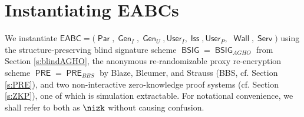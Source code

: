 \documentclass[runningheads]{llncs}
\DeclareMathOperator{\issuer}{\mathsf{Iss}}
\DeclareMathOperator{\wallet}{\mathsf{Wall}}
\DeclareMathOperator{\service}{\mathsf{Serv}}
\DeclareMathOperator{\BSIG}{\ensuremath{\mathsf{BSIG}}}
\DeclareMathOperator{\PRE}{\ensuremath{\mathsf{PRE}}}
\DeclareMathOperator{\COM}{\ensuremath{\mathsf{COM}}}
\DeclareMathOperator{\param}{\mathsf{Par}}
\DeclareMathOperator{\gen}{\mathsf{Gen}}
\begin{document}
\section{Instantiating EABCs}
\label{s:EABCinstantiation}

%
%
We instantiate  $\mathsf{EABC}=(\param, \gen_{I}, \gen_{U}, \mathsf{User}_I,\issuer, \mathsf{User}_P,$ $\wallet, \service)$ using 
the structure-preserving  blind signature scheme $\BSIG=\BSIG_{AGHO}$ from Section \ref{s:blindAGHO}, 
the anonymous re-randomizable proxy re-encryption scheme $\PRE=\PRE_{BBS}$ by Blaze, Bleumer, and Strauss (BBS, cf. Section \ref{s:PRE}), 
and two non-interactive zero-knowledge proof systems  (cf. Section \ref{s:ZKP}), one of which is simulation extractable.
For notational convenience, we shall refer to both as $\nizk$ without causing confusion.
\end{document}
